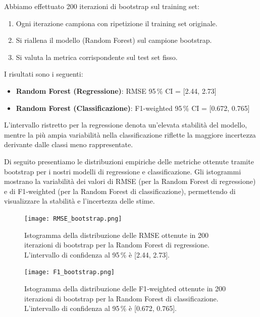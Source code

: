 \documentclass[conference]{IEEEtran}
\begin{document}
\vfill\null
Abbiamo effettuato 200 iterazioni di bootstrap sul training set:
\begin{enumerate}
  \item Ogni iterazione campiona con ripetizione il training set originale.
  \item Si riallena il modello (Random Forest) sul campione bootstrap.
  \item Si valuta la metrica corrispondente sul test set fisso.
\end{enumerate}

\noindent I risultati sono i seguenti:
\begin{itemize}
  \item \textbf{Random Forest (Regressione)}: RMSE 95\,\% CI = [2.44, 2.73]
  \item \textbf{Random Forest (Classificazione)}: F1-weighted 95\,\% CI = [0.672, 0.765]
\end{itemize}

L’intervallo ristretto per la regressione denota un’elevata stabilità del modello, mentre la più ampia variabilità nella classificazione riflette la maggiore incertezza derivante dalle classi meno rappresentate.

Di seguito presentiamo le distribuzioni empiriche delle metriche ottenute tramite bootstrap per i nostri modelli di regressione e classificazione. Gli istogrammi mostrano la variabilità dei valori di RMSE (per la Random Forest di regressione) e di F1‐weighted (per la Random Forest di classificazione), permettendo di visualizzare la stabilità e l’incertezza delle stime.

\begin{figure}[H]
\centering
\texttt{[image: RMSE\_bootstrap.png]}
\caption{Istogramma della distribuzione delle RMSE ottenute in 200 iterazioni di bootstrap per la Random Forest di regressione. L’intervallo di confidenza al 95\,\% è [2.44, 2.73].}
\label{fig:rmse-bootstrap}
\end{figure}

\begin{figure}[H]
\centering
\texttt{[image: F1\_bootstrap.png]}
\caption{Istogramma della distribuzione delle F1‐weighted ottenute in 200 iterazioni di bootstrap per la Random Forest di classificazione. L’intervallo di confidenza al 95\,\% è [0.672, 0.765].}
\label{fig:f1-bootstrap}
\end{figure}
\end{document}
